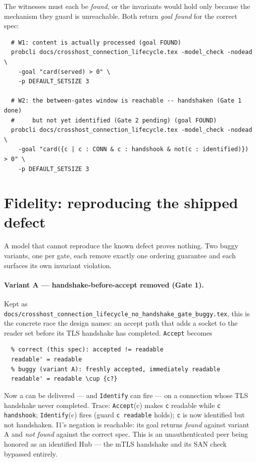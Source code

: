 \documentclass[a4paper,10pt,fleqn]{article}
\begin{document}
The witnesses must each be \emph{found}, or the invariants would hold only
because the mechanism they guard is unreachable.  Both return \emph{goal
found} for the correct spec:
\begin{verbatim}
  # W1: content is actually processed (goal FOUND)
  probcli docs/crosshost_connection_lifecycle.tex -model_check -nodead \
    -goal "card(served) > 0" \
    -p DEFAULT_SETSIZE 3

  # W2: the between-gates window is reachable -- handshaken (Gate 1 done)
  #     but not yet identified (Gate 2 pending) (goal FOUND)
  probcli docs/crosshost_connection_lifecycle.tex -model_check -nodead \
    -goal "card({c | c : CONN & c : handshook & not(c : identified)}) > 0" \
    -p DEFAULT_SETSIZE 3
\end{verbatim}

\section{Fidelity: reproducing the shipped defect}
\label{sec:fidelity}

A model that cannot reproduce the known defect proves nothing.  Two buggy
variants, one per gate, each remove exactly one ordering guarantee and
each surfaces its own invariant violation.

\paragraph{Variant A --- handshake-before-accept removed (Gate 1).}
Kept as
\texttt{docs/crosshost\_connection\_lifecycle\_no\_handshake\_gate\_buggy.tex},
this is the concrete race the design names: an accept path that adds a
socket to the reader set before its TLS handshake has completed.
\texttt{Accept} becomes
\begin{verbatim}
  % correct (this spec): accepted != readable
  readable' = readable
  % buggy (variant A): freshly accepted, immediately readable
  readable' = readable \cup {c?}
\end{verbatim}
Now a  can be delivered --- and \texttt{Identify} can
fire --- on a connection whose TLS handshake never completed.  Trace:
\texttt{Accept}(c) makes \texttt{c} readable while
\texttt{c \notin handshook}; \texttt{Identify}(c) fires (guard
\texttt{c \in readable} holds); \texttt{c} is now identified but not
handshaken.  I1's negation is reachable: its goal returns \emph{found}
against variant A and \emph{not found} against the correct spec.  This is
an unauthenticated peer being honored as an identified Hub --- the mTLS
handshake and its SAN check bypassed entirely.
\end{document}
